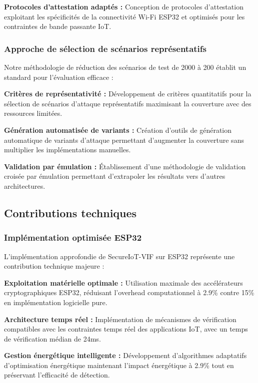 \textbf{Protocoles d'attestation adaptés :} Conception de protocoles d'attestation exploitant les spécificités de la connectivité Wi-Fi ESP32 et optimisés pour les contraintes de bande passante IoT.

\subsubsection{Approche de sélection de scénarios représentatifs}

Notre méthodologie de réduction des scénarios de test de 2000 à 200 établit un standard pour l'évaluation efficace :

\textbf{Critères de représentativité :} Développement de critères quantitatifs pour la sélection de scénarios d'attaque représentatifs maximisant la couverture avec des ressources limitées.

\textbf{Génération automatisée de variants :} Création d'outils de génération automatique de variants d'attaque permettant d'augmenter la couverture sans multiplier les implémentations manuelles.

\textbf{Validation par émulation :} Établissement d'une méthodologie de validation croisée par émulation permettant d'extrapoler les résultats vers d'autres architectures.

\subsection{Contributions techniques}

\subsubsection{Implémentation optimisée ESP32}

L'implémentation approfondie de SecureIoT-VIF sur ESP32 représente une contribution technique majeure :

\textbf{Exploitation matérielle optimale :} Utilisation maximale des accélérateurs cryptographiques ESP32, réduisant l'overhead computationnel à 2.9\% contre 15\% en implémentation logicielle pure.

\textbf{Architecture temps réel :} Implémentation de mécanismes de vérification compatibles avec les contraintes temps réel des applications IoT, avec un temps de vérification médian de 24ms.

\textbf{Gestion énergétique intelligente :} Développement d'algorithmes adaptatifs d'optimisation énergétique maintenant l'impact énergétique à 2.9\% tout en préservant l'efficacité de détection.


